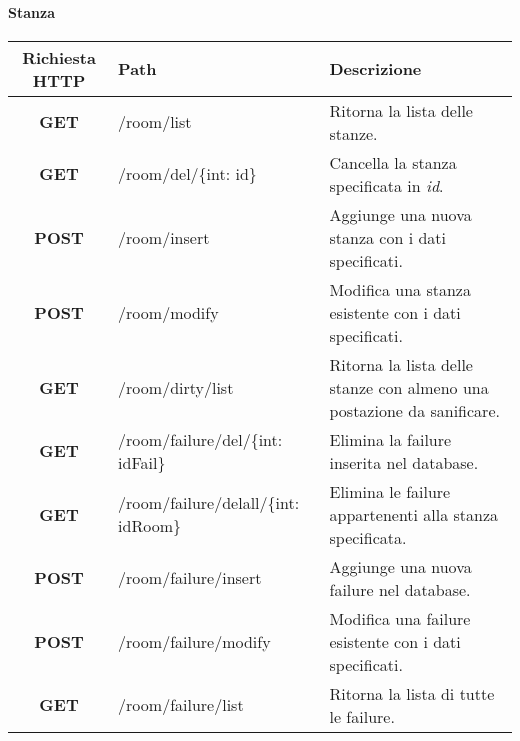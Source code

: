 \paragraph{Stanza}
\begin{center}
	\begin{longtable}{|c|p{7cm}|p{5cm}|}
		\hline
		\rowcolor{lighter-grayer}
		\textbf{Richiesta HTTP} & \textbf{Path} & \textbf{Descrizione}\\		
		\hline
		\endfirsthead
		\textbf{GET} & /room/list & Ritorna la lista delle stanze.\\
		\hline
		\textbf{GET} & /room/del/\{int: id\} & Cancella la stanza specificata in \textit{id}.\\
		\hline
		\textbf{POST} & /room/insert & Aggiunge una nuova stanza con i dati specificati.\\
		\hline
		\textbf{POST} & /room/modify & Modifica una stanza esistente con i dati specificati.\\
		\hline
		\textbf{GET} & /room/dirty/list & Ritorna la lista delle stanze con almeno una postazione da sanificare.\\
		\hline
		\textbf{GET} & /room/failure/del/\{int: idFail\} & Elimina la failure inserita nel database.\\
		\hline
		\textbf{GET} & /room/failure/delall/\{int: idRoom\} & Elimina le failure appartenenti alla stanza specificata.\\
		\hline
		\textbf{POST} & /room/failure/insert & Aggiunge una nuova failure nel database.\\
		\hline
		\textbf{POST} & /room/failure/modify & Modifica una failure esistente con i dati specificati.\\
		\hline
		\textbf{GET} & /room/failure/list & Ritorna la lista di tutte le failure.\\
		\hline
	\end{longtable}
\end{center}
